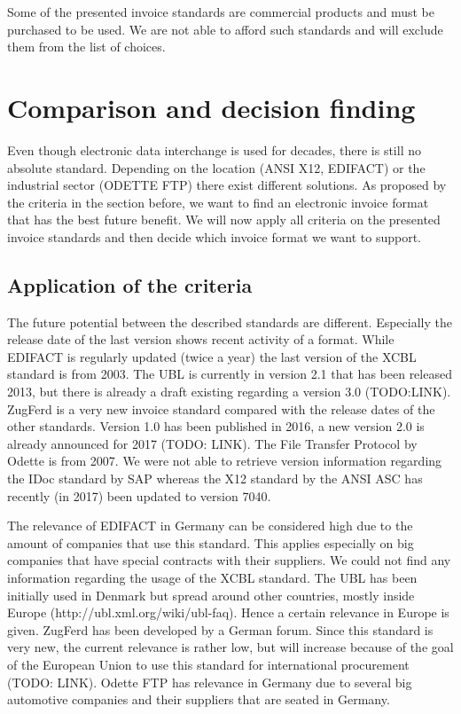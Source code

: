 Some of the presented invoice standards are commercial products and must be purchased to be used. We are not able to afford such standards and will exclude them from the list of choices. 

\section{Comparison and decision finding}
\label{sec2.3}

Even though electronic data interchange is used for decades, there is still no absolute standard. Depending on the location (ANSI X12, EDIFACT) or the industrial sector (ODETTE FTP) there exist different solutions. As proposed by the criteria in the section before, we want to find an electronic invoice format that has the best future benefit. We will now apply all criteria on the presented invoice standards and then decide which invoice format we want to support.

\subsection{Application of the criteria}
\label{sec2.3.1}

The future potential between the described standards are different. Especially the release date of the last version shows recent activity of a format. While EDIFACT is regularly updated (twice a year) the last version of the XCBL standard is from 2003. The UBL is currently in version 2.1 that has been released 2013, but there is already a draft existing regarding a version 3.0 (TODO:LINK). ZugFerd is a very new invoice standard compared with the release dates of the other standards. Version 1.0 has been published in 2016, a new version 2.0 is already announced for 2017 (TODO: LINK). The File Transfer Protocol by Odette is from 2007. We were not able to retrieve version information regarding the IDoc standard by SAP whereas the X12 standard by the ANSI ASC has recently (in 2017) been updated to version 7040.

The relevance of EDIFACT in Germany can be considered high due to the amount of companies that use this standard. This applies especially on big companies that have special contracts with their suppliers. We could not find any information regarding the usage of the XCBL standard. The UBL has been initially used in Denmark but spread around other countries, mostly inside Europe (http://ubl.xml.org/wiki/ubl-faq). Hence a certain relevance in Europe is given. ZugFerd has been developed by a German forum. Since this standard is very new, the current relevance is rather low, but will increase because of the goal of the European Union to use this standard for international procurement (TODO: LINK). Odette FTP has relevance in Germany due to several big automotive companies and their suppliers that are seated in Germany. 

